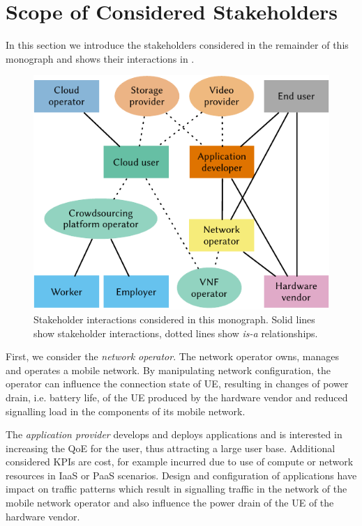 \section{Scope of Considered Stakeholders}\label{sec:introduction:considered_stakeholders}

In this section we introduce the stakeholders considered in the remainder of this monograph and shows their interactions in .

\begin{figure}
\centering
\includegraphics{figures/stakeholders}
\caption{Stakeholder interactions considered in this monograph. Solid lines show stakeholder interactions, dotted lines show \emph{is-a} relationships.}\label{fig:introduction:stakeholders}
\end{figure}

First, we consider the \emph{network operator}.
The network operator owns, manages and operates a mobile network.
By manipulating network configuration, the operator can influence the connection state of \gls{UE}, resulting in changes of power drain, i.e. battery life, of the \gls{UE} produced by the hardware vendor and reduced signalling load in the components of its mobile network.

The \emph{application provider} develops and deploys applications and is interested in increasing the \gls{QoE} for the user, thus attracting a large user base.
Additional considered \glspl{KPI} are cost, for example incurred due to use of compute or network resources in \gls{IaaS} or \gls{PaaS} scenarios.
Design and configuration of applications have impact on traffic patterns which result in signalling traffic in the network of the mobile network operator and also influence the power drain of the \gls{UE} of the hardware vendor.

